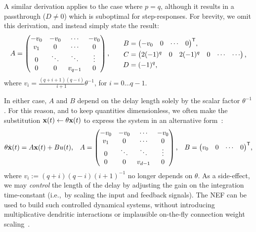 A similar derivation applies to the case where $p = q$, although it results in a passthrough ($D \ne 0$) which is suboptimal for step-responses.
For brevity, we omit this derivation, and instead simply state the result:
\begin{equation*}
    \begin{alignedat}{2}
        A &= \begin{pmatrix} -v_0 & -v_0 & \cdots & -v_0 \\ v_1 & 0 & \cdots & 0 \\ 0 & \ddots & \ddots & \vdots \\ 0 & 0 & v_{q-1} & 0\end{pmatrix} \text{,} & & \quad\quad \begin{alignedat}{1}
            B &= {\begin{pmatrix}-v_0 & 0 & \cdots & 0\end{pmatrix}}^\mathsf{T} \text{,} \\
            C &= \begin{pmatrix} 2(-1)^q & 0 & 2(-1)^q & 0 & \cdots & \cdots \end{pmatrix} \text{,} \\
            D &= (-1)^q \text{,}
        \end{alignedat}
    \end{alignedat}
\end{equation*}
where $v_i = \frac{(q+i+1)(q-i)}{i+1} \theta^{-1}$, for $i = 0 \ldots q-1$.

In either case, $A$ and $B$ depend on the delay length solely by the scalar factor $\theta^{-1}$.
For this reason, and to keep quantities dimensionless, we often make the substitution $\mathbf{x}(t) \leftarrow \theta\mathbf{x}(t)$ to express the system in an alternative form~\citep{braindrop2019}:
\begin{equation} \label{eq:delay-system}
  \theta \dot{\mathbf{x}}(t) = A\mathbf{x}(t) + Bu(t) \text{,} \quad
  A = \begin{pmatrix} -v_0 & -v_0 & \cdots & -v_0 \\ v_1 & 0 & \cdots & 0 \\ 0 & \ddots & \ddots & \vdots \\ 0 & 0 & v_{d-1} & 0\end{pmatrix} \text{,} \quad 
  B = {\begin{pmatrix} v_0 & 0 & \cdots & 0\end{pmatrix}}^\mathsf{T} \text{,} 
\end{equation}
where $v_i := (q+i)(q-i)(i+1)^{-1}$ no longer depends on $\theta$. %
As a side-effect, we may \emph{control} the length of the delay by adjusting the gain on the integration time-constant (i.e.,~by scaling the input and feedback signals).
The NEF can be used to build such controlled dynamical systems, without introducing multiplicative dendritic interactions or implausible on-the-fly connection weight scaling~\citep{eliasmith2000b}.

